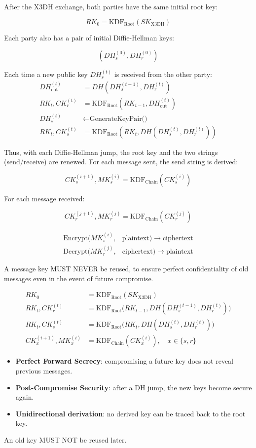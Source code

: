 After the X3DH exchange, both parties have the same initial root key:

\[
    RK_0 = \text{KDF}_{\text{Root}}(SK_{\text{X3DH}})
\]

Each party also has a pair of initial Diffie-Hellman keys:

\[
    (DH_s^{(0)}, DH_r^{(0)})
\]

Each time a new public key \(DH_r^{(t)}\) is received from the other party:
\begin{align*}
    DH_{\text{out}}^{(t)} &= DH(DH_s^{(t-1)}, DH_r^{(t)}) \\
    RK_t, CK_r^{(t)} &= \mathrm{KDF}_{\text{Root}}(RK_{t-1}, 
DH_{\text{out}}^{(t)}) \\
    DH_s^{(t)} &\leftarrow \text{GenerateKeyPair()} \\
    RK_t, CK_s^{(t)} &= \mathrm{KDF}_{\text{Root}}(RK_t, DH(DH_s^{(t)}, 
DH_r^{(t)}))
\end{align*}

Thus, with each Diffie-Hellman jump, the root key and the two strings 
(send/receive) are renewed. For each message sent, the send string is derived:

\[
    CK_s^{(i+1)}, MK_s^{(i)} = \mathrm{KDF}_{\text{Chain}}(CK_s^{(i)})
\]

For each message received:

\[
    CK_r^{(j+1)}, MK_r^{(j)} = \mathrm{KDF}_{\text{Chain}}(CK_r^{(j)})
\]

\begin{align*}
    \mathrm{Encrypt}(MK_s^{(i)}, &\text{plaintext}) \to \text{ciphertext}\\
    \mathrm{Decrypt}(MK_r^{(j)}, &\text{ciphertext}) \to \text{plaintext}
\end{align*}

A message key MUST NEVER be reused, to ensure perfect confidentiality of old 
messages even in the event of future compromise.

\begin{align*}
    RK_0 &= \mathrm{KDF}_{\text{Root}}(SK_{\text{X3DH}}) \\[6pt]
    RK_t, CK_r^{(t)} &= \mathrm{KDF}_{\text{Root}}\big(RK_{t-1}, 
DH(DH_s^{(t-1)}, DH_r^{(t)})\big) \\[6pt]
    RK_t, CK_s^{(t)} &= \mathrm{KDF}_{\text{Root}}\big(RK_t, DH(DH_s^{(t)}, 
DH_r^{(t)})\big) \\[6pt]
    CK_{x}^{(i+1)}, MK_{x}^{(i)} &= \mathrm{KDF}_{\text{Chain}}(CK_{x}^{(i)}), 
\quad x \in \{s, r\}
\end{align*}

\begin{itemize}
    \item \textbf{Perfect Forward Secrecy}: compromising a future key does not 
        reveal previous messages.
    \item \textbf{Post-Compromise Security}: after a DH jump, the new keys 
        become secure again.
    \item \textbf{Unidirectional derivation}: no derived key can be traced back 
        to the root key.
\end{itemize}

An old key MUST NOT be reused later.